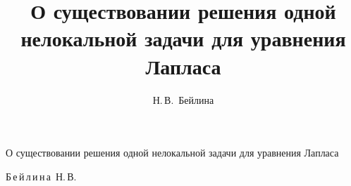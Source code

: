%

%


%

%









\renewcommand{\firstpage}{205} 

\renewcommand{\lastpage}{208} 
















\title{О существовании решения одной нелокальной задачи для уравнения Лапласа}%

{О существовании решения одной нелокальной задачи для уравнения Лапласа}%



\author{Н.\,В.~Бейлина}%

{Б\,е\,й\,л\,и\,н\,а~Н.\,В.}%














